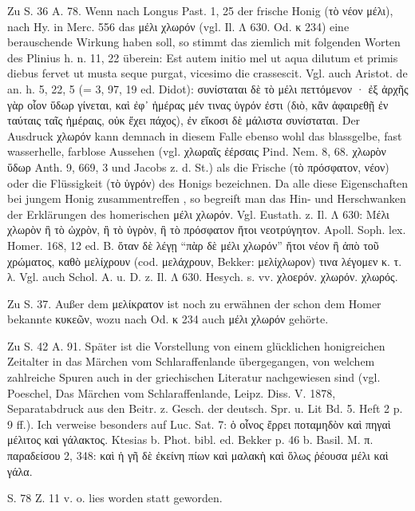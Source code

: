\documentclass[a4paper, 11pt, oneside]{article}
\begin{document}
Zu S. 36 A. 78. Wenn nach Longus Past. 1, 25 der frische Honig (τὸ νέον μέλι), nach Hy. in Merc. 556 das μέλι χλωρόν (vgl. Il. Λ 630. Od. κ 234) eine berauschende Wirkung haben soll, so stimmt das ziemlich mit folgenden Worten des Plinius h. n. 11, 22 überein: Est autem initio mel ut aqua dilutum et primis diebus fervet ut musta seque purgat, vicesimo die crassescit. Vgl. auch Aristot. de an. h. 5, 22, 5 (= 3, 97, 19 ed. Didot): συνίσταται δὲ τὸ μέλι πεττόμενον · ἐξ ἀρχῆς γὰρ οἷον ὕδωρ γίνεται, καὶ ἐφ᾽ ἡμέρας μέν τινας ὑγρόν ἐστι (διὸ, κἂν ἀφαιρεθῇ ἐν ταύταις ταῖς ἡμέραις, οὐκ ἔχει πάχος), ἐν εἴκοσι δὲ μάλιστα συνίσταται. Der Ausdruck χλωρόν kann demnach in diesem Falle ebenso wohl das blassgelbe, fast wasserhelle, farblose Aussehen (vgl. χλωραῖς ἐέρσαις Pind. Nem. 8, 68. χλωρὸν ὕδωρ Anth. 9, 669, 3 und Jacobs z. d. St.) als die Frische (τὸ πρόσφατον, νέον) oder die Flüssigkeit (τὸ ὑγρόν) des Honigs bezeichnen. Da alle diese Eigenschaften bei jungem Honig zusammentreffen , so begreift man das Hin- und Herschwanken der Erklärungen des homerischen μέλι χλωρόν. Vgl. Eustath. z. Il. Λ 630: Μέλι χλωρὸν ἢ τὸ ὠχρὸν, ἢ τὸ ὑγρὸν, ἢ τὸ πρόσφατον ἤτοι νεοτρύγητον. Apoll. Soph. lex. Homer. 168, 12 ed. B. ὅταν δὲ λέγῃ "`πὰρ δὲ μέλι χλωρόν"' ἤτοι νέον ἢ ἀπὸ τοῦ χρώματος, καθὸ μελίχρουν (cod. μελάχρουν, Bekker: μελίχλωρον) τινα λέγομεν κ. τ. λ. Vgl. auch Schol. A. u. D. z. Il. Λ 630. Hesych. s. vv. χλοερόν. χλωρόν. χλωρός.

Zu S. 37. Außer dem μελίκρατον ist noch zu erwähnen der schon dem Homer bekannte κυκεῶν, wozu nach Od. κ 234 auch μέλι χλωρόν gehörte.

Zu S. 42 A. 91. Später ist die Vorstellung von einem glücklichen honigreichen Zeitalter in das Märchen vom Schlaraffenlande übergegangen, von welchem zahlreiche Spuren auch in der griechischen Literatur nachgewiesen sind (vgl. Poeschel, Das Märchen vom Schlaraffenlande, Leipz. Diss. V. 1878, Separatabdruck aus den Beitr. z. Gesch. der deutsch. Spr. u. Lit Bd. 5. Heft 2 p. 9 ff.). Ich verweise besonders auf Luc. Sat. 7: ὁ οἶνος ἔρρει ποταμηδὸν καὶ πηγαὶ μέλιτος καὶ γάλακτος. Ktesias b. Phot. bibl. ed. Bekker p. 46 b. Basil. M. π. παραδείσου 2, 348: καὶ ἡ γῆ δὲ ἐκείνη πίων καὶ μαλακὴ καὶ ὅλως ῥέουσα μέλι καὶ γάλα.

S. 78 Z. 11 v. o. lies worden statt geworden.
\end{document}
